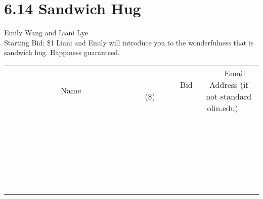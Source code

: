 \documentclass[11pt]{article}
\begin{document}
\section*{6.14 Sandwich Hug}
Emily Wang and Liani Lye
\\
Starting Bid: \$1
\newline
Liani and Emily will introduce you to the wonderfulness that is sandwich hug.  Happiness guaranteed.
\\[6ex]
\begin{tabular}{c c c}
~~~~~~~~~~~~~Name~~~~~~~~~~~~~ & ~~~~~~~~~Bid (\$)~~~~~~~~~  & ~~~Email Address (if not standard olin.edu)~~~\\
 & & \\
\hline
 & & \\
\hline
 & & \\
\hline
 & & \\
\hline
 & & \\
\hline
 & & \\
\hline
 & & \\
\hline
 & & \\
\hline
 & & \\
\hline
 & & \\
\hline
 & & \\
\hline
 & & \\
\hline
 & & \\
\hline
 & & \\
\hline
 & & \\
\hline
 & & \\
\hline
 & & \\
\hline
 & & \\
\hline
 & & \\
\hline
 & & \\
\hline
 & & \\
\hline
 & & \\
\hline
 & & \\
\hline
 & & \\
\hline
 & & \\
\hline
 & & \\
\hline
\end{tabular}
\newpage
\end{document}
